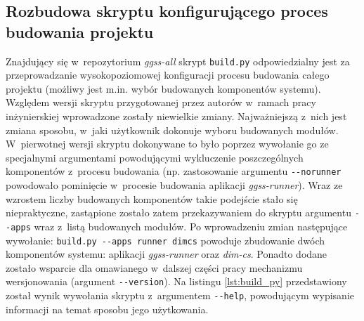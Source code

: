 \subsection{Rozbudowa skryptu konfigurującego proces budowania projektu}
Znajdujący się w~repozytorium \emph{ggss-all} skrypt \lstinline{build.py} odpowiedzialny jest za przeprowadzanie wysokopoziomowej konfiguracji procesu budowania całego projektu (możliwy jest m.in. wybór budowanych komponentów systemu). Względem wersji skryptu przygotowanej przez autorów w~ramach pracy inżynierskiej wprowadzone zostały niewielkie zmiany. Najważniejszą z~nich jest zmiana sposobu, w~jaki użytkownik dokonuje wyboru budowanych modułów. W~pierwotnej wersji skryptu dokonywane to było poprzez wywołanie go ze specjalnymi argumentami powodującymi wykluczenie poszczególnych komponentów z~procesu budowania (np. zastosowanie argumentu \lstinline{--norunner} powodowało pominięcie w~procesie budowania aplikacji \emph{ggss-runner}). Wraz ze wzrostem liczby budowanych komponentów takie podejście stało się niepraktyczne, zastąpione zostało zatem przekazywaniem do skryptu argumentu \lstinline{--apps} wraz z~listą budowanych modułów. Po wprowadzeniu zmian następujące wywołanie: \lstinline{build.py --apps runner dimcs} powoduje zbudowanie dwóch komponentów systemu: aplikacji \emph{ggss-runner} oraz \emph{dim-cs}. Ponadto dodane zostało wsparcie dla omawianego w~dalszej części pracy mechanizmu wersjonowania (argument \lstinline{--version}). Na listingu \ref{lst:build_py} przedstawiony został wynik wywołania skryptu z~argumentem \lstinline{--help}, powodującym wypisanie informacji na temat sposobu jego użytkowania.

